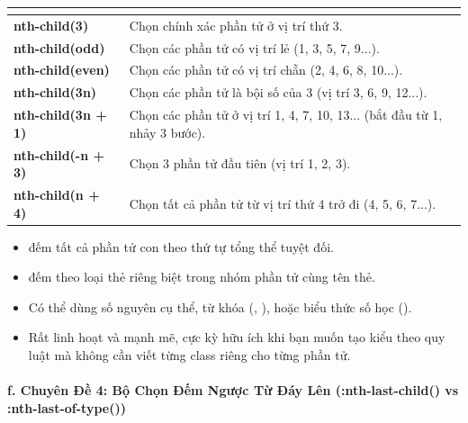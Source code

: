 \begin{prettyTableBox}
\sffamily\small
\begin{tabularx}{\linewidth}{|>{\ttfamily\color{accentOrange}\bfseries}m{3.8cm}|Z|}
\hline
{}  &  \\
\hline
nth-child(3) & Chọn chính xác phần tử ở vị trí thứ 3. \\
\hline
nth-child(odd) & Chọn các phần tử có vị trí lẻ (1, 3, 5, 7, 9...). \\
\hline
nth-child(even) & Chọn các phần tử có vị trí chẵn (2, 4, 6, 8, 10...). \\
\hline
nth-child(3n) & Chọn các phần tử là bội số của 3 (vị trí 3, 6, 9, 12...). \\
\hline
nth-child(3n + 1) & Chọn các phần tử ở vị trí 1, 4, 7, 10, 13... (bắt đầu từ 1, nhảy 3 bước). \\
\hline
nth-child(-n + 3) & Chọn 3 phần tử đầu tiên (vị trí 1, 2, 3). \\
\hline
nth-child(n + 4) & Chọn tất cả phần tử từ vị trí thứ 4 trở đi (4, 5, 6, 7...). \\
\hline
\end{tabularx}
\end{prettyTableBox}

\begin{conceptBox}
\begin{itemize}[leftmargin=1.5em, itemsep=2pt, parsep=0pt]
    \item {} đếm tất cả phần tử con theo thứ tự tổng thể tuyệt đối.
    \item {} đếm theo loại thẻ riêng biệt trong nhóm phần tử cùng tên thẻ.
    \item Có thể dùng số nguyên cụ thể, từ khóa (, ), hoặc biểu thức số học ().
    \item Rất linh hoạt và mạnh mẽ, cực kỳ hữu ích khi bạn muốn tạo kiểu theo quy luật mà không cần viết từng class riêng cho từng phần tử.
\end{itemize}
\end{conceptBox}

\paragraph{f. Chuyên Đề 4: Bộ Chọn Đếm Ngược Từ Đáy Lên (:nth-last-child() vs :nth-last-of-type())}

